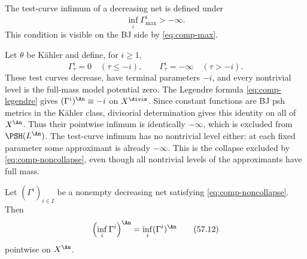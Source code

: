 The test-curve infimum of a decreasing net is defined under
\[
                         \inf_i\Gamma^i_{\max}>-\infty.
\tag{57.11}\label{eq:comp-noncollapse}
\]
This condition is visible on the BJ side by \eqref{eq:comp-max}.

\begin{example}
\label{ex:comp-noncollapse-necessity}
Let $\theta$ be K\"ahler and define, for $i\geq1$,
\[
 \Gamma^i_\tau=0\quad(\tau\leq-i),
 \qquad
 \Gamma^i_\tau=-\infty\quad(\tau>-i).
\]
These test curves decrease, have terminal parameters $-i$, and
every nontrivial level is the full-mass model potential zero.
The Legendre formula \eqref{eq:comp-legendre} gives
$(\Gamma^i)^{\An}\equiv-i$ on $X^{\divis}$.
Since constant functions are BJ psh metrics in the K\"ahler class,
divisorial determination gives this identity on all of $X^{\An}$.
Thus their pointwise infimum is identically $-\infty$, which is
excluded from $\PSH(L^{\An})$.
The test-curve infimum has no nontrivial level either: at each
fixed parameter some approximant is already $-\infty$.
This is the collapse excluded by \eqref{eq:comp-noncollapse},
even though all nontrivial levels of the approximants have full mass.
\end{example}

\begin{proposition}\label{prop:comp-decreasing-nets}
Let $(\Gamma^i)_{i\in I}$ be a nonempty decreasing net satisfying
\eqref{eq:comp-noncollapse}.
Then
\[
                 \left(\inf_i\Gamma^i\right)^{\An}
                    =\inf_i(\Gamma^i)^{\An}
\tag{57.12}\label{eq:comp-decreasing}
\]
pointwise on $X^{\An}$.
\end{proposition}

